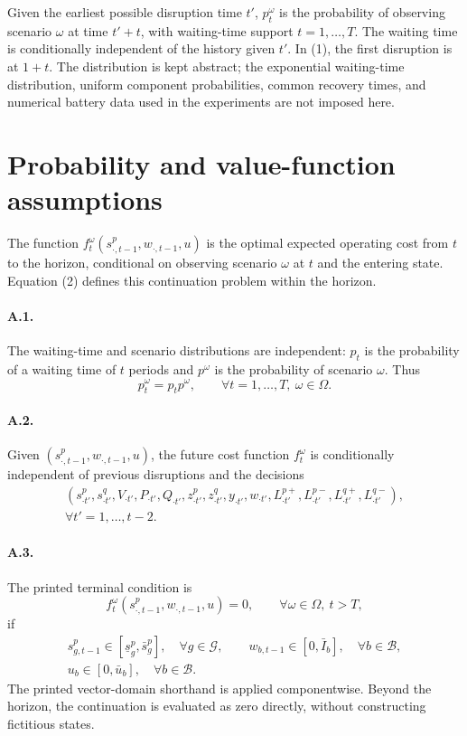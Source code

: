 \documentclass[10pt]{article}
\begin{document}
Given the earliest possible disruption time $t'$, $p_t^\omega$ is the probability of observing scenario $\omega$ at time $t'+t$, with waiting-time support $t=1,\ldots,T$. The waiting time is conditionally independent of the history given $t'$. In (1), the first disruption is at $1+t$. The distribution is kept abstract; the exponential waiting-time distribution, uniform component probabilities, common recovery times, and numerical battery data used in the experiments are not imposed here.

\section*{Probability and value-function assumptions}
The function $f_t^\omega(s_{\cdot,t-1}^p,w_{\cdot,t-1},u)$ is the optimal expected operating cost from $t$ to the horizon, conditional on observing scenario $\omega$ at $t$ and the entering state. Equation (2) defines this continuation problem within the horizon.

\paragraph{A.1.}
The waiting-time and scenario distributions are independent: $p_t$ is the probability of a waiting time of $t$ periods and $p^\omega$ is the probability of scenario $\omega$. Thus
\begin{equation}
p_t^\omega=p_t p^\omega,\qquad\forall t=1,\ldots,T,\ \omega\in\Omega.\tag{A.1}
\end{equation}
\paragraph{A.2.}
Given $(s_{\cdot,t-1}^p,w_{\cdot,t-1},u)$, the future cost function $f_t^\omega$ is conditionally independent of previous disruptions and the decisions
\[
\begin{gathered}
(s_{\cdot t'}^p,s_{\cdot t'}^q,V_{\cdot t'},P_{\cdot t'},Q_{\cdot t'},z_{\cdot t'}^p,z_{\cdot t'}^q,y_{\cdot t'},w_{\cdot t'},
L_{\cdot t'}^{p+},L_{\cdot t'}^{p-},L_{\cdot t'}^{q+},L_{\cdot t'}^{q-}),\\
\forall t'=1,\ldots,t-2.
\end{gathered}
\]
\paragraph{A.3.}
The printed terminal condition is
\begin{equation}
f_t^\omega(s_{\cdot,t-1}^p,w_{\cdot,t-1},u)=0,\qquad\forall\omega\in\Omega,\ t>T,\tag{A.3}
\end{equation}
if
\[
\begin{gathered}
s_{g,t-1}^p\in[\underline s_g^p,\bar s_g^p],\quad\forall g\in\mathcal G,\qquad
w_{b,t-1}\in[0,\bar I_b],\quad\forall b\in\mathcal B,\\
u_b\in[0,\bar u_b],\quad\forall b\in\mathcal B.
\end{gathered}
\]
The printed vector-domain shorthand is applied componentwise. Beyond the horizon, the continuation is evaluated as zero directly, without constructing fictitious states.
\end{document}
